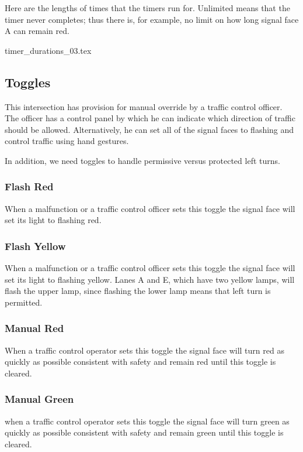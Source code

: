 \documentclass[letterpaper,twoside]{article}
\begin{document}
Here are the lengths of times that the timers run for.  Unlimited means
that the timer never completes; thus there is, for example, no limit on
how long signal face A can remain red.

 {timer_durations_03.tex}

\subsection{Toggles}

This intersection has provision for manual override by a traffic control
officer.  The officer has a control panel by which he can indicate which
direction of traffic should be allowed.  Alternatively, he can set all
of the signal faces to flashing and control traffic using hand gestures.

In addition, we need toggles to handle permissive versus protected
left turns.

\subsubsection{Flash Red}
When a malfunction or a traffic control officer sets this toggle
the signal face will set its light to flashing red.

\subsubsection{Flash Yellow}
When a malfunction or a traffic control officer sets this toggle
the signal face will set its light to flashing yellow.
Lanes A and E, which have two yellow lamps, will flash the upper lamp,
since flashing the lower lamp means that left turn is permitted.

\subsubsection{Manual Red}
When a traffic control operator sets this toggle the signal face will
turn red as quickly as possible consistent with safety and remain
red until this toggle is cleared.

\subsubsection{Manual Green}
when a traffic control operator sets this toggle the signal face will
turn green as quickly as possible consistent with safety and remain
green until this toggle is cleared.
\end{document}
